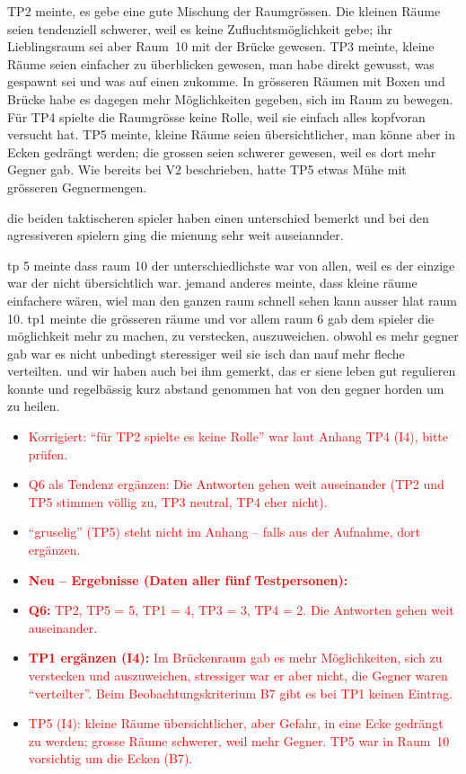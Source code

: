 \documentclass[../Main.tex]{subfiles}
\begin{document}
TP2 meinte, es gebe eine gute Mischung der Raumgrössen. Die kleinen Räume seien tendenziell schwerer, weil es keine Zufluchtsmöglichkeit gebe; ihr Lieblingsraum sei aber Raum~10 mit der Brücke gewesen. TP3 meinte, kleine Räume seien einfacher zu überblicken gewesen, man habe direkt gewusst, was gespawnt sei und was auf einen zukomme. In grösseren Räumen mit Boxen und Brücke habe es dagegen mehr Möglichkeiten gegeben, sich im Raum zu bewegen. Für TP4 spielte die Raumgrösse keine Rolle, weil sie einfach alles kopfvoran versucht hat. TP5 meinte, kleine Räume seien übersichtlicher, man könne aber in Ecken gedrängt werden; die grossen seien schwerer gewesen, weil es dort mehr Gegner gab. Wie bereits bei V2 beschrieben, hatte TP5 etwas Mühe mit grösseren Gegnermengen.

die beiden taktischeren spieler haben einen unterschied bemerkt und bei den agressiveren spielern ging die mienung sehr weit auseiannder.

tp 5 meinte dass raum 10 der unterschiedlichste war von allen, weil es der einzige war der nicht übersichtlich war. jemand anderes meinte, dass kleine räume einfachere wären, wiel man den ganzen raum schnell sehen kann ausser hlat raum 10. tp1 meinte die grösseren räume und vor allem raum 6 gab dem spieler die möglichkeit mehr zu machen, zu verstecken, auszuweichen. obwohl es mehr gegner gab war es nicht unbedingt steressiger weil sie isch dan nauf mehr fleche verteilten. und wir haben auch bei ihm gemerkt, das er siene leben gut regulieren konnte und regelbässig kurz abstand genommen hat von den gegner horden um zu heilen.
\begin{itemize}[leftmargin=1.5cm]
    \item \textcolor{red}{Korrigiert: \enquote{für TP2 spielte es keine Rolle} war laut Anhang TP4 (I4), bitte prüfen.}
    \item \textcolor{red}{Q6 als Tendenz ergänzen: Die Antworten gehen weit auseinander (TP2 und TP5 stimmen völlig zu, TP3 neutral, TP4 eher nicht).}
    \item \textcolor{red}{\enquote{gruselig} (TP5) steht nicht im Anhang -- falls aus der Aufnahme, dort ergänzen.}
\end{itemize}

\begin{itemize}[leftmargin=1.5cm]
    \item \textcolor{red}{\textbf{Neu -- Ergebnisse (Daten aller fünf Testpersonen):}}
    \item \textcolor{red}{\textbf{Q6:} TP2, TP5 = 5, TP1 = 4, TP3 = 3, TP4 = 2. Die Antworten gehen weit auseinander.}
    \item \textcolor{red}{\textbf{TP1 ergänzen (I4):} Im Brückenraum gab es mehr Möglichkeiten, sich zu verstecken und auszuweichen, stressiger war er aber nicht, die Gegner waren \enquote{verteilter}. Beim Beobachtungskriterium B7 gibt es bei TP1 keinen Eintrag.}
    \item \textcolor{red}{TP5 (I4): kleine Räume übersichtlicher, aber Gefahr, in eine Ecke gedrängt zu werden; grosse Räume schwerer, weil mehr Gegner. TP5 war in Raum~10 vorsichtig um die Ecken (B7).}
\end{itemize}
\end{document}
